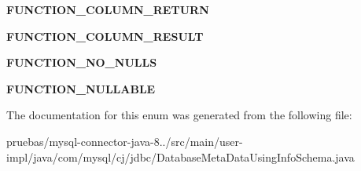 \begin{DoxyCompactItemize}
\mbox{\label{enumcom_1_1mysql_1_1cj_1_1jdbc_1_1_database_meta_data_using_info_schema_1_1_function_constant_a433484e2e38542ce75cc013e64b3ee81}} 
{\bfseries F\+U\+N\+C\+T\+I\+O\+N\+\_\+\+C\+O\+L\+U\+M\+N\+\_\+\+R\+E\+T\+U\+RN}
\item 
\mbox{\label{enumcom_1_1mysql_1_1cj_1_1jdbc_1_1_database_meta_data_using_info_schema_1_1_function_constant_aad83ccccaf64f8dfab75164848970380}} 
{\bfseries F\+U\+N\+C\+T\+I\+O\+N\+\_\+\+C\+O\+L\+U\+M\+N\+\_\+\+R\+E\+S\+U\+LT}
\item 
\mbox{\label{enumcom_1_1mysql_1_1cj_1_1jdbc_1_1_database_meta_data_using_info_schema_1_1_function_constant_afd9b1db683c023a8a9f32700644c0b55}} 
{\bfseries F\+U\+N\+C\+T\+I\+O\+N\+\_\+\+N\+O\+\_\+\+N\+U\+L\+LS}
\item 
\mbox{\label{enumcom_1_1mysql_1_1cj_1_1jdbc_1_1_database_meta_data_using_info_schema_1_1_function_constant_a84a45e7e2772711a44ced18b9a971855}} 
{\bfseries F\+U\+N\+C\+T\+I\+O\+N\+\_\+\+N\+U\+L\+L\+A\+B\+LE}
\end{DoxyCompactItemize}


The documentation for this enum was generated from the following file\+:\begin{DoxyCompactItemize}
\item 
pruebas/mysql-\/connector-\/java-\/8../src/main/user-\/impl/java/com/mysql/cj/jdbc/Database\+Meta\+Data\+Using\+Info\+Schema.\+java\end{DoxyCompactItemize}
